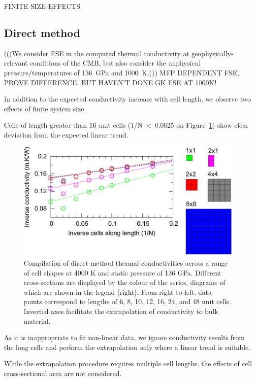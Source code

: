 \documentclass[%
preprint,                                  %
nofootinbib,
 amsmath,amssymb,
 aps,
]{revtex4-1}
\begin{document}
FINITE SIZE EFFECTS


\subsection{\label{sec:results.direct}Direct method}

(((We consider FSE in the computed thermal conductivity at geophysically-relevant conditions of the CMB, but also consider the unphysical pressure/temperatures of 136~GPa and 1000~K.)))
MFP DEPENDENT FSE, PROVE DIFFERENCE. 
BUT HAVEN'T DONE GK FSE AT 1000K!

In addition to the expected conductivity increase with cell length, we observe two effects of finite system size.

Cells of length greater than 16 unit cells (1/N~\textless~0.0625 on Figure~\ref{fig:all_data}) show clear deviation from the expected linear trend.

\begin{figure}[h]
  \includegraphics[width=\linewidth]{images/all_data.png}
  \caption{Compilation of direct method thermal conductivities across a range of cell shapes at 4000 K and static pressure of 136 GPa. Different cross-sections are displayed by the colour of the series, diagrams of which are shown in the legend (right). From right to left, data points correspond to lengths of 6, 8, 10, 12, 16, 24, and 48 unit cells. Inverted axes facilitate the extrapolation of conductivity to bulk material.}
  \label{fig:all_data}
\end{figure}

As it is inappropriate to fit non-linear data, we ignore conductivity results from the long cells and perform the extrapolation only where a linear trend is suitable.

While the extrapolation procedure requires multiple cell lengths, the effects of cell cross-sectional area are not considered. 
\end{document}
